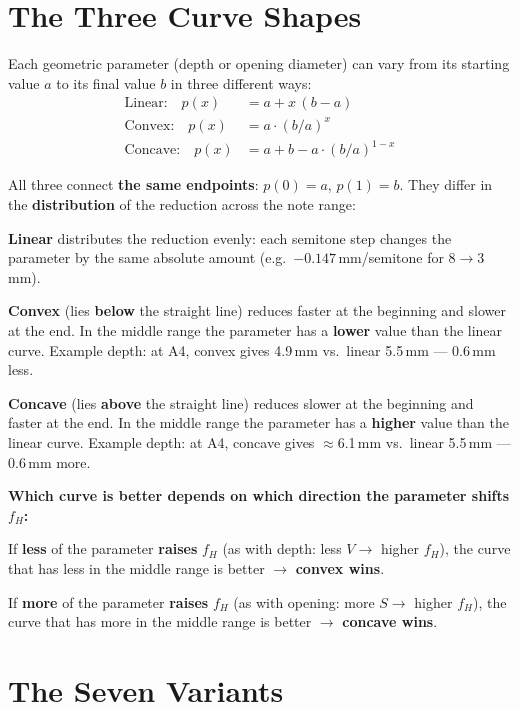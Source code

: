 \documentclass[11pt,a4paper]{article}
\begin{document}
\section{The Three Curve Shapes}

Each geometric parameter (depth or opening diameter) can vary from its starting value $a$ to its final value $b$ in three different ways:
\begin{align}
\text{Linear:}\quad p(x) &= a + x\,(b - a) \\
\text{Convex:}\quad p(x) &= a \cdot (b/a)^x \\
\text{Concave:}\quad p(x) &= a + b - a \cdot (b/a)^{1-x}
\end{align}

All three connect \textbf{the same endpoints}: $p(0) = a$, $p(1) = b$. They differ in the \textbf{distribution} of the reduction across the note range:

\textbf{Linear} distributes the reduction evenly: each semitone step changes the parameter by the same absolute amount (e.g.\ $-0{.}147$\,mm/semitone for $8 \to 3$\,mm).

\textbf{Convex} (lies \textbf{below} the straight line) reduces faster at the beginning and slower at the end. In the middle range the parameter has a \textbf{lower} value than the linear curve. Example depth: at A4, convex gives 4.9\,mm vs.\ linear 5.5\,mm --- 0.6\,mm less.

\textbf{Concave} (lies \textbf{above} the straight line) reduces slower at the beginning and faster at the end. In the middle range the parameter has a \textbf{higher} value than the linear curve. Example depth: at A4, concave gives $\approx$6.1\,mm vs.\ linear 5.5\,mm --- 0.6\,mm more.

\begin{warnbox}
\textbf{Which curve is better depends on which direction the parameter shifts $f_H$:}

If \textbf{less} of the parameter \textbf{raises} $f_H$ (as with depth: less $V \to$ higher $f_H$), the curve that has less in the middle range is better $\to$ \textbf{convex wins}.

If \textbf{more} of the parameter \textbf{raises} $f_H$ (as with opening: more $S \to$ higher $f_H$), the curve that has more in the middle range is better $\to$ \textbf{concave wins}.
\end{warnbox}

\section{The Seven Variants}
\end{document}
